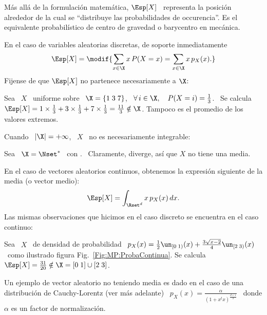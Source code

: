 M\'as  all\'a  de  la formulaci\'on  matem\'atica,
$\Esp[X]$ \  representa la posici\'on alrededor  de la cual  se ``distribuye las
probabilidades de occurencia''. Es  el equivalente probabil\'istico de centro de
gravedad o barycentro en mec\'anica.

En el  caso de variables  aleatorias discretas, de soporte   inmediatamente
%
\[
\Esp[X] = \modif{\sum_{x \in \X} x \, P(X = x) = \sum_{x \in \X} x \, p_X(x).}
\]
%
\noindent  Fijense de  que $\Esp[X]$  no partenece  necesariamente a  $\X$:
%
\begin{ejemplo}
\label{Ej:MP:Uniforme3Estados}
%
  Sea \  $X$ \  uniforme sobre \  $\X = \{  1 \; 3  \; 7 \}$,  \ie \
  $\forall \,  i \in \X, \quad  P(X = i) =  \frac13$. \ Se calcula  $\Esp[X] = 1
  \times \frac13  + 3 \times \frac13  + 7 \times \frac13  = \frac{11}{3} \notin
  \X$.  Tampoco es el promedio de los valores extremos.
\end{ejemplo}
%
\noindent Cuando \ $|\X| = +\infty$, \ $X$ \ no es necesariamente integrable:
%
\begin{ejemplo}
\label{Ej:MP:DiscretaSinMedia}
%
Sea  \ $\X  = \Nset^*$  \ con  . \
Claramente,  diverge, as\'i que $X$ no tiene
una media.
\end{ejemplo}

En el caso de vectores  aleatorios continuos, obtenemos la expresi\'on siguiente
de la media (o vector medio):
%
\[
\Esp[X] = \int_{\Rset^d} x \, p_X(x) \, dx.
\]
%
\noindent Las mismas observaciones que  hicimos en el caso discreto se encuentra
en el caso continuo:
%
\begin{ejemplo}
\label{Ej:MP:MediaNoEnX}
%
Sea \ $X$ \ de densidad de  probabilidad \ $p_X(x) = \frac12 \un_{[0 \; 1)}(x) +
\frac{3   \sqrt{x-2}}{4}   \un_{[2   \;   3)}(x)$  \   como   ilustrado   figura
Fig.~\ref{Fig:MP:ProbaContinua}.
Se calcula \ $\Esp[X] = \frac{31}{20} \notin \X = [0 \; 1] \cup [2 \; 3]$.
\end{ejemplo}
%
\begin{ejemplo}
\label{Ej:MP:VariableCauchySinMedia}
%
  Un ejemplo  de vector aleatorio no  teniendo media es  dado en el caso  de una
  distribuci\'on de Cauchy-Lorentz (ver  m\'as adelante) \ $\displaystyle p_X(x)
  = \frac{\alpha}{\left( 1 + x^t x \right)^{\frac{d+1}{2}}}$ \ donde $\alpha$ es
  un factor de normalizaci\'on.
\end{ejemplo}

